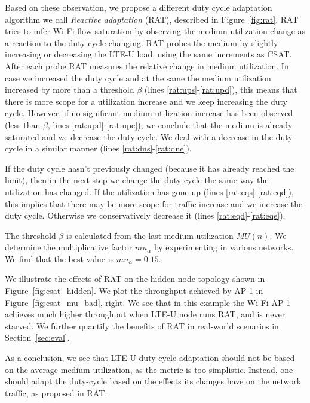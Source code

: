 Based on these observation, we propose a different duty cycle adaptation algorithm we call {\em Reactive adaptation} (RAT), described in Figure~\ref{fig:rat}. 
RAT tries to infer Wi-Fi flow saturation by observing the medium utilization change as a reaction to the duty cycle changing. 
RAT probes the medium by slightly increasing or decreasing the LTE-U load, using the same increments as CSAT. 
After each probe RAT measures the relative change in medium utilization. 
In case we increased the duty cycle and at the same the medium utilization increased by more than a threshold $\beta$ (lines \ref{rat:ups}-\ref{rat:upd}), this means that there is more scope for a utilization increase and we keep increasing the duty cycle. 
However, if no significant medium utilization increase has been observed (less than $\beta$, lines \ref{rat:upd}-\ref{rat:upe}), we conclude that the medium is already saturated and we decrease the duty cycle. 
We deal with a decrease in the duty cycle in a similar manner (lines \ref{rat:dns}-\ref{rat:dne}). 

If the duty cycle hasn't previously changed (because it has already reached the limit), then in the next step we change the duty cycle the same way the utilization has changed. 
If the utilization has gone up (lines \ref{rat:eqs}-\ref{rat:eqd}), this implies that there may be more scope for traffic increase and we increase the duty cycle. Otherwise we conservatively decrease it (lines \ref{rat:eqd}-\ref{rat:eqe}).

The threshold $\beta$ is calculated from the last medium utilization $MU(n)$. We determine the multiplicative factor $mu_{\alpha}$ by experimenting in various networks. We find that the best value is $mu_{\alpha} = 0.15$.

We illustrate the effects of RAT on the hidden node topology shown in Figure~\ref{fig:csat_hidden}. 
We plot the throughput achieved by AP 1 in Figure~\ref{fig:csat_mu_bad}, right. 
We see that in this example the Wi-Fi AP 1 achieves much higher throughput when LTE-U node runs RAT, and is never starved. 
We further quantify the benefits of RAT in real-world scenarios in Section~\ref{sec:eval}.

As a conclusion, we see that LTE-U duty-cycle adaptation should not be based on the average medium utilization, as the metric is too simplistic. Instead, one should adapt the duty-cycle based on the effects its changes have on the network traffic, as proposed in RAT.
 


